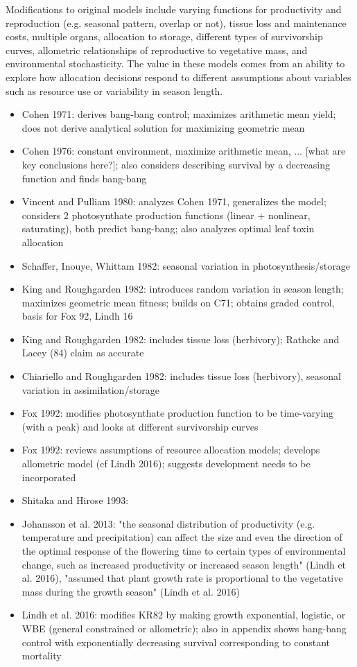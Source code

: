 \documentclass[12pt, oneside,titlepage]{article}   	%
\begin{document}
Modifications to original models include varying functions for productivity and reproduction (e.g. seasonal pattern, overlap or not), tissue loss and maintenance costs, multiple organs, allocation to storage, different types of survivorship curves, allometric relationships of reproductive to vegetative mass, and environmental stochasticity. The value in these models comes from an ability to explore how allocation decisions respond to different assumptions about variables such as resource use or variability in season length. 

\singlespace
\begin{itemize}

\item Cohen 1971: derives bang-bang control; maximizes arithmetic mean yield; does not derive analytical solution for maximizing geometric mean
\item Cohen 1976: constant environment, maximize arithmetic mean, ... [what are key conclusions here?]; also considers describing survival by a decreasing function and finds bang-bang
\item Vincent and Pulliam 1980: analyzes Cohen 1971, generalizes the model; considers 2 photosynthate production functions (linear + nonlinear, saturating), both predict bang-bang; also analyzes optimal leaf toxin allocation
\item Schaffer, Inouye, Whittam 1982: seasonal variation in photosynthesis/storage
\item King and Roughgarden 1982: introduces random variation in season length; maximizes geometric mean fitness; builds on C71; obtains graded control, basis for Fox 92, Lindh 16
\item King and Roughgarden 1982: includes tissue loss (herbivory); Rathcke and Lacey (84) claim as accurate
\item Chiariello and Roughgarden 1982: includes tissue loss (herbivory), seasonal variation in assimilation/storage
\item Fox 1992: modifies photosynthate production function to be time-varying (with a peak) and looks at different survivorship curves
\item Fox 1992: reviews assumptions of resource allocation models; develops allometric model (cf Lindh 2016); suggests development needs to be incorporated
\item Shitaka and Hirose 1993:
\item Johansson et al. 2013: "the seasonal distribution of productivity (e.g. temperature and precipitation) can affect the size and even the direction of the optimal response of the flowering time to certain types of environmental change, such as increased productivity or increased season length" (Lindh et al. 2016), "assumed that plant growth rate is proportional to the vegetative mass during the growth season" (Lindh et al. 2016)
\item Lindh et al. 2016: modifies KR82 by making growth exponential, logistic, or WBE (general constrained or allometric); also in appendix shows bang-bang control with exponentially decreasing survival corresponding to constant mortality

\end{itemize}
\doublespace
\end{document}
